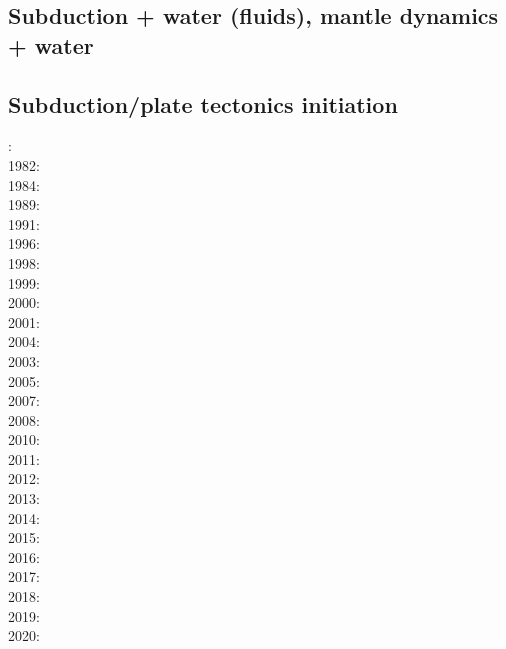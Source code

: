 \subsection{Subduction + water (fluids), mantle dynamics + water}

{\scriptsize
\noindent
\cite{vakp02}
\cite{abvk06}
\cite{roms10}
\cite{geme11}\cite{vahs11}
\cite{fagm12}
\cite{qubu14}\cite{mabv14}\cite{malg14}\cite{wisv14}
\cite{bomv15}\cite{nani15}
\cite{ceww17}\cite{wewv17}
\cite{ceww19}\cite{meag19}\cite{ligc19}
}

\subsection{Subduction/plate tectonics initiation}

{\scriptsize
{}: \cite{bird78}\\
1982: \cite{clwv82}\\
1984: \cite{cade84}\\
1989: \cite{clwv89}\\
1991: \cite{muph91}\\
1996: \cite{kest96}\\
1998: \cite{togu98}\\
1999: \cite{fagd99}\\
2000: \cite{pybf00}\\
2001: \cite{dohe01}\cite{reyb01}\cite{brry01}\\
2004: \cite{ster04}\cite{guhl04}\cite{solo04}\\
2003: \cite{hags03}\\
2005: \cite{bihi05}\\
2007: \cite{kore07}\\
2008: \cite{uegs08}\\
2010: \cite{nigm10}\cite{bucl10}\\
2011: \cite{bagw11}\cite{nigm11}\cite{legu11}\\
2012: \cite{stri12}\cite{thka12}\cite{lega12}\cite{shch12}\\
2013: \cite{dyge13}\cite{mana13}\cite{kore13}\cite{mibg13}\\
2014: \cite{recf14}\cite{macg14}\cite{crta14}\\
2015: \cite{matv15}\cite{pebu15}\cite{vapm15}\cite{legu15}\cite{gesb15}\\
2016: \cite{crta16}\cite{maka16}\cite{bags16}\\
2017: \cite{magm17}\\
2018: \cite{zhlg18}\cite{basq18}\\
2019: \cite{begb19}\cite{gubg19}\cite{ulcw19}\cite{gubg19}\cite{zhli19}\\
2020: \cite{arla20}\cite{zhlg20}\cite{mapg20}
}

